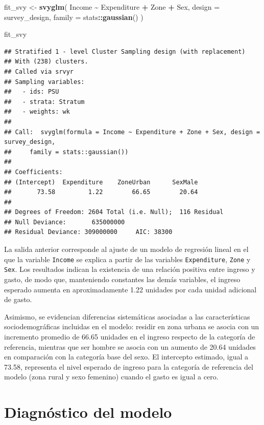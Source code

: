 \documentclass[
  spanish,
  12pt,
]{book}
\newenvironment{Shaded}{\begin{snugshade}}{\end{snugshade}}
\newcommand{\AttributeTok}[1]{\textcolor[rgb]{0.13,0.29,0.53}{#1}}
\newcommand{\FunctionTok}[1]{\textcolor[rgb]{0.13,0.29,0.53}{\textbf{#1}}}
\newcommand{\NormalTok}[1]{#1}
\newcommand{\OtherTok}[1]{\textcolor[rgb]{0.56,0.35,0.01}{#1}}
\newcommand{\SpecialCharTok}[1]{\textcolor[rgb]{0.81,0.36,0.00}{\textbf{#1}}}
\begin{document}
\begin{Shaded}
\begin{Highlighting}[]
\NormalTok{fit\_svy }\OtherTok{\textless{}{-}} \FunctionTok{svyglm}\NormalTok{(}
\NormalTok{  Income }\SpecialCharTok{\textasciitilde{}}\NormalTok{ Expenditure }\SpecialCharTok{+}\NormalTok{ Zone }\SpecialCharTok{+}\NormalTok{ Sex,}
  \AttributeTok{design =}\NormalTok{ survey\_design,}
  \AttributeTok{family =}\NormalTok{ stats}\SpecialCharTok{::}\FunctionTok{gaussian}\NormalTok{()}
\NormalTok{)}

\NormalTok{fit\_svy}
\end{Highlighting}
\end{Shaded}

\begin{verbatim}
## Stratified 1 - level Cluster Sampling design (with replacement)
## With (238) clusters.
## Called via srvyr
## Sampling variables:
##   - ids: PSU 
##   - strata: Stratum 
##   - weights: wk 
## 
## Call:  svyglm(formula = Income ~ Expenditure + Zone + Sex, design = survey_design, 
##     family = stats::gaussian())
## 
## Coefficients:
## (Intercept)  Expenditure    ZoneUrban      SexMale  
##       73.58         1.22        66.65        20.64  
## 
## Degrees of Freedom: 2604 Total (i.e. Null);  116 Residual
## Null Deviance:       635000000 
## Residual Deviance: 309000000     AIC: 38300
\end{verbatim}

La salida anterior corresponde al ajuste de un modelo de regresión lineal en el que la variable \texttt{Income} se explica a partir de las variables \texttt{Expenditure}, \texttt{Zone} y \texttt{Sex}. Los resultados indican la existencia de una relación positiva entre ingreso y gasto, de modo que, manteniendo constantes las demás variables, el ingreso esperado aumenta en aproximadamente 1.22 unidades por cada unidad adicional de gasto.

Asimismo, se evidencian diferencias sistemáticas asociadas a las características sociodemográficas incluidas en el modelo: residir en zona urbana se asocia con un incremento promedio de 66.65 unidades en el ingreso respecto de la categoría de referencia, mientras que ser hombre se asocia con un aumento de 20.64 unidades en comparación con la categoría base del sexo. El intercepto estimado, igual a 73.58, representa el nivel esperado de ingreso para la categoría de referencia del modelo (zona rural y sexo femenino) cuando el gasto es igual a cero.

\section{Diagnóstico del modelo}\label{diagnostico-del-modelo}
\end{document}
